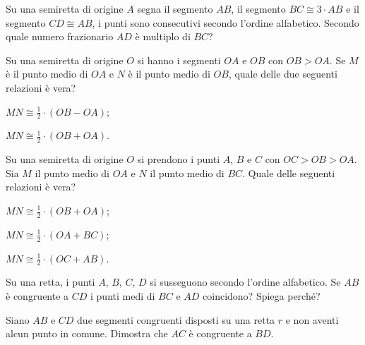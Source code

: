 \begin{multicols}{2}
 
\begin{esercizio}
Su una semiretta di origine \(A\) segna il segmento \(AB\), il segmento 
\(BC\cong 3\cdot AB\) e il segmento \(CD\cong AB\), i punti sono 
consecutivi secondo l'ordine alfabetico. Secondo quale numero 
frazionario \(AD\) è multiplo di \(BC\)?
\end{esercizio}

\begin{esercizio}
Su una semiretta di origine \(O\) si hanno i segmenti \(OA\) e \(OB\) con 
\(OB>OA\). Se \(M\) è il punto medio di \(OA\) e \(N\) è il punto medio di 
\(OB\), quale delle due seguenti relazioni è vera?
\begin{enumeratea}
\item \(MN\cong \frac{1}{2}\cdot(OB-OA)\);
\item \(MN\cong \frac{1}{2}\cdot(OB+OA)\).
\end{enumeratea}
\end{esercizio}

\begin{esercizio}
Su una semiretta di origine \(O\) si prendono i punti \(A\), \(B\) e \(C\) 
con \(OC>OB>OA\). Sia \(M\) il punto medio di \(OA\) e \(N\) il punto medio 
di \(BC\). Quale delle seguenti relazioni è vera?
\begin{enumeratea}
\item \(MN\cong\frac{1}{2}\cdot(OB+OA)\);
\item \(MN\cong\frac{1}{2}\cdot(OA+BC)\);
\item \(MN\cong\frac{1}{2}\cdot(OC+AB)\).
\end{enumeratea}
\end{esercizio}

\begin{esercizio}
Su una retta, i punti \(A\), \(B\), \(C\), \(D\) si susseguono secondo 
l'ordine alfabetico. Se \(AB\) è congruente a \(CD\) i punti medi di \(BC\) 
e \(AD\) coincidono? Spiega perché?
\end{esercizio}

\begin{esercizio}
Siano \(AB\) e \(CD\) due segmenti congruenti disposti su una retta \(r\) e 
non aventi alcun punto in comune. Dimostra che \(AC\) è congruente a 
\(BD\).
\end{esercizio}


\end{multicols}
